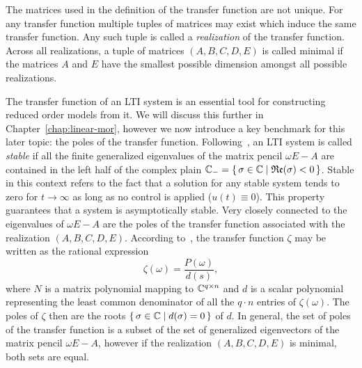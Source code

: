\begin{remark}
    The matrices used in the definition of the transfer function are not unique.
    For any transfer function multiple tuples of matrices may exist which induce the same transfer function.
    Any such tuple is called a \emph{realization} of the transfer function.
    Across all realizations, a tuple of matrices $(A, B, C, D, E)$ is called minimal if the matrices $A$ and $E$ have the smallest possible dimension amongst all possible realizations.
\end{remark}

The transfer function of an LTI system is an essential tool for constructing reduced order models from it.
We will discuss this further in Chapter~\ref{chap:linear-mor}, however we now introduce a key benchmark for this later topic: the poles of the transfer function.
Following~\cite{Benner2017}, an LTI system is called \emph{stable} if all the finite generalized eigenvalues of the matrix pencil $\omega E - A$ are contained in the left half of the complex plain $\mathbb{C}_{-} = \left\{\,\sigma \in \mathbb{C}\mid\mathfrak{Re}(\sigma) < 0\,\right\}$.
Stable in this context refers to the fact that a solution for any stable system tends to zero for $t \rightarrow \infty$ as long as no control is applied ($u(t) \equiv 0$).
This property guarantees that a system is asymptotically stable.
Very closely connected to the eigenvalues of $\omega E - A$ are the poles of the transfer function associated with the realization $(A, B, C, D, E)$.
According to~\cite[Section~2]{Benner2017}, the transfer function $\zeta$ may be written as the rational expression
\begin{equation*}
    \zeta(\omega) = \frac{P(\omega)}{d(s)},
\end{equation*}
where $N$ is a matrix polynomial mapping to $\mathbb{C}^{q \times n}$ and $d$ is a scalar polynomial representing the least common denominator of all the $q \cdot n$ entries of $\zeta(\omega)$.
The poles of $\zeta$ then are the roots $\left\{\,\sigma \in \mathbb{C}\mid d(\sigma) = 0\,\right\}$ of $d$.
In general, the set of poles of the transfer function is a subset of the set of generalized eigenvectors of the matrix pencil $\omega E - A$, however if the realization $(A, B, C, D, E)$ is minimal, both sets are equal.

